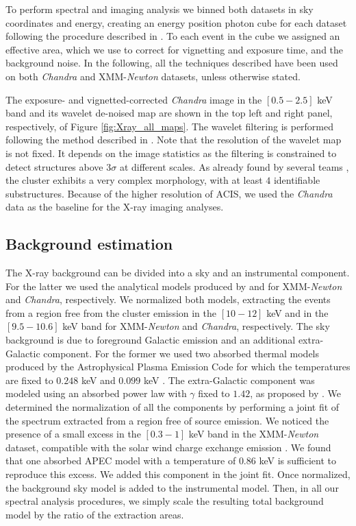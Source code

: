 \documentclass[twocolumn,traditabstract]{aa}
\begin{document}
To perform spectral and imaging analysis we binned both datasets in sky coordinates and energy, creating an energy position photon cube for each dataset following the procedure described in \cite{bourdin2008}. To each event in the cube we assigned an effective area, which we use to correct for vignetting and exposure time, and the background noise. In the following, all the techniques described have been used on both \textit{Chandra} and XMM-\textit{Newton} datasets, unless otherwise stated.

The exposure- and vignetted-corrected \textit{Chandra} image in the $[0.5-2.5]$ keV band and its wavelet de-noised map are shown in the top left and right panel, respectively, of Figure \ref{fig:Xray_all_maps}. The wavelet filtering is performed following the method described in \cite{bourdin2013}. Note that the resolution of the wavelet map is not fixed. It depends on the image statistics as the filtering is constrained to detect structures above $3\sigma$ at different scales. As already found by several teams \citep[e.g.,][]{Zitrin2009,Ma2009}, the cluster exhibits a very complex morphology, with at least $4$ identifiable substructures. Because of the higher resolution of ACIS, we used the \textit{Chandra} data as the baseline for the X-ray imaging analyses.

\subsection{Background estimation}
The X-ray background can be divided into a sky and an instrumental component. For the latter we used the analytical models produced by \cite{bourdin2013} and \cite{bartalucci2014} for XMM-\textit{Newton} and \textit{Chandra}, respectively. We normalized both models, extracting the events from a region free from the cluster emission in the $[10-12]$ keV and in the $[9.5-10.6]$ keV band for XMM-\textit{Newton} and \textit{Chandra}, respectively. The sky background is due to foreground Galactic emission and an additional extra-Galactic component. For the former we used two absorbed thermal models produced by the Astrophysical Plasma Emission Code \citep[APEC,][]{smith2001} for which the temperatures are fixed to $0.248$ keV and $0.099$ keV \citep[see][]{kuntz2000}. The extra-Galactic component was modeled using an absorbed power law with $\gamma$ fixed to $1.42$, as proposed by \cite{lumb2002}. We determined the normalization of all the components by performing a joint fit of the spectrum extracted from a region free of source emission. We noticed the presence of a small excess in the $[0.3-1]$ keV band in the XMM-\textit{Newton} dataset, compatible with the solar wind charge exchange emission \citep{snowden2004}. We found that one absorbed APEC model with a temperature of $0.86$ keV is sufficient to reproduce this excess. We added this component in the joint fit. Once normalized, the background sky model is added to the instrumental model. Then, in all our spectral analysis procedures, we simply scale the resulting total background model by the ratio of the extraction areas.
\end{document}
